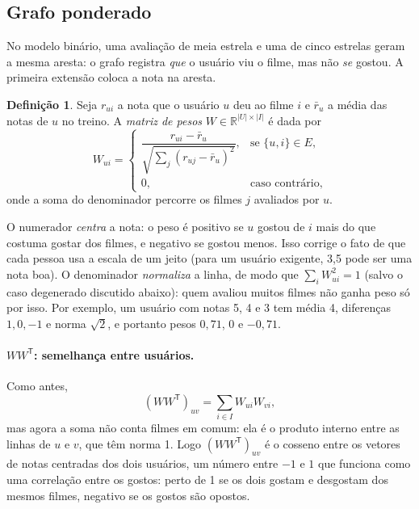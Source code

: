 \documentclass[12pt,a4paper]{article}
\theoremstyle{definition}
\newtheorem{definicao}{Definição}
\begin{document}
\subsection{Grafo ponderado}\label{sec:ponderado}

No modelo binário, uma avaliação de meia estrela e uma de cinco estrelas
geram a mesma aresta: o grafo registra \emph{que} o usuário viu o filme,
mas não \emph{se} gostou. A primeira extensão coloca a nota na aresta.

\begin{definicao}
Seja $r_{ui}$ a nota que o usuário $u$ deu ao filme $i$ e $\bar r_u$ a
média das notas de $u$ no treino. A \emph{matriz de pesos}
$W \in \mathbb{R}^{|U| \times |I|}$ é dada por
\[
  W_{ui} =
  \begin{cases}
    \dfrac{r_{ui} - \bar r_u}{\sqrt{\sum_{j} (r_{uj} - \bar r_u)^2}},
      & \text{se } \{u, i\} \in E,\\[2ex]
    0, & \text{caso contrário,}
  \end{cases}
\]
onde a soma do denominador percorre os filmes $j$ avaliados por $u$.
\end{definicao}

O numerador \emph{centra} a nota: o peso é positivo se $u$ gostou de $i$
mais do que costuma gostar dos filmes, e negativo se gostou menos. Isso
corrige o fato de que cada pessoa usa a escala de um jeito (para um
usuário exigente, 3{,}5 pode ser uma nota boa). O denominador
\emph{normaliza} a linha, de modo que $\sum_i W_{ui}^2 = 1$ (salvo o caso degenerado discutido
abaixo):
quem avaliou muitos filmes não ganha peso só por isso. Por exemplo, um
usuário com notas 5, 4 e 3 tem média 4, diferenças $1, 0, -1$ e norma
$\sqrt 2$, e portanto pesos $0{,}71$, $0$ e $-0{,}71$.

\paragraph{$WW^{\mathsf T}$: semelhança entre usuários.}
Como antes,
\[
  (WW^{\mathsf T})_{uv} = \sum_{i \in I} W_{ui} W_{vi},
\]
mas agora a soma não conta filmes em comum: ela é o produto interno entre
as linhas de $u$ e $v$, que têm norma 1. Logo $(WW^{\mathsf T})_{uv}$ é o
cosseno entre os vetores de notas centradas dos dois usuários, um número
entre $-1$ e $1$ que funciona como uma correlação entre os gostos: perto
de 1 se os dois gostam e desgostam dos mesmos filmes, negativo se os
gostos são opostos.
\end{document}
